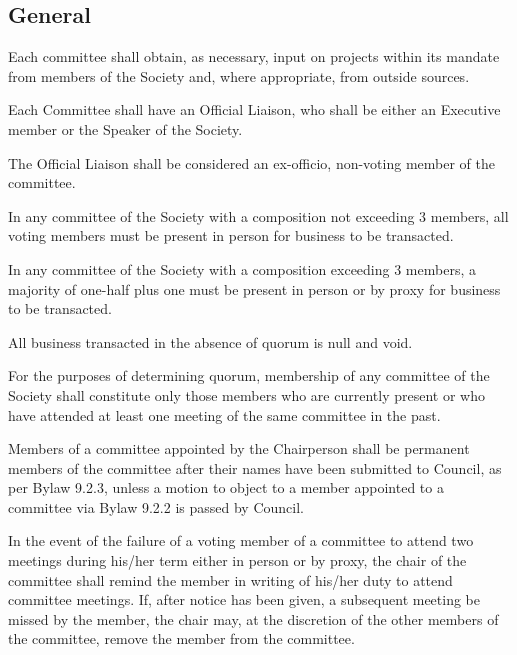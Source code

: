 \subsection {General}
\begin{longenum}[ label*=\thesubsection.\arabic*., align=left]
	\item Each committee shall obtain, as necessary, input on projects within its mandate from members of the Society and, where appropriate, from outside sources. 
    \item Each Committee shall have an Official Liaison, who shall be either an Executive member or the Speaker of the Society. 
    \item The Official Liaison shall be considered an ex-officio, non-voting member of the committee.
    \item In any committee of the Society with a composition not exceeding 3 members, all voting members must be present in person for business to be transacted.
    \item In any committee of the Society with a composition exceeding 3 members, a majority of one-half plus one must be present in person or by proxy for business to be transacted. 
    \item All business transacted in the absence of quorum is null and void. 
    \item For the purposes of determining quorum, membership of any committee of the Society shall constitute only those members who are currently present or who have attended at least one meeting of the same committee in the past.
    \item Members of a committee appointed by the Chairperson shall be permanent members of the committee after their names have been submitted to Council, as per Bylaw 9.2.3, unless a motion to object to a member appointed to a committee via Bylaw 9.2.2 is passed by Council.
    \item In the event of the failure of a voting member of a committee to attend two meetings during his/her term either in person or by proxy, the chair of the committee shall remind the member in writing of his/her duty to attend committee meetings. If, after notice has been given, a subsequent meeting be missed by the member, the chair may, at the discretion of the other members of the committee, remove the member from the committee.
\end{longenum}

